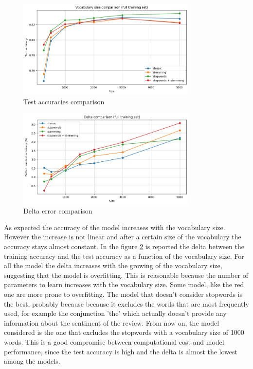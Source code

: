 \documentclass{article}
\begin{document}
    \begin{figure}[H]
        \centering
        \includegraphics[width=0.8\textwidth]{vocsize_comparison_plot.png}
        \caption{\small Test accuracies comparison}
        \label{fig:comparison}
    \end{figure}

    \begin{figure}[H]
        \centering
        \includegraphics[width=0.8\textwidth]{delta_comparison.png}
        \caption{\small Delta error comparison}
        \label{fig:delta}
    \end{figure}

\noindent
As expected the accuracy of the model increases with the vocabulary size. However the increase is not linear and after a certain size of the vocabulary the accuracy
stays almost constant. In the figure \ref{fig:delta} is reported the delta between the training accuracy and the test accuracy as a function of the vocabulary size.
For all the model the delta increases with the growing of the vocabulary size, suggesting that the model is overfitting. This is reasonable because the number of
parameters to learn increases with the vocabulary size. Some model, like the red one are more prone to overfitting.
The model that doesn't consider stopwords is the best, probably because because it excludes the words that are most frequently used, for example the conjunction 'the'
which actually doesn't provide any information about the sentiment of the review. From now on, the model considered is the one that excludes the stopwords with a vocabulary
size of 1000 words. This is a good compromise between computational cost and model performance, since the test accuracy is high and the delta is almost the 
lowest among the models.\\
\end{document}

